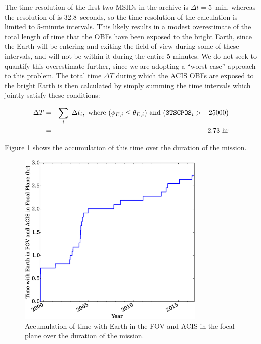 \documentclass[11pt]{article}
\begin{document}
The time resolution of the first two MSIDs in the archive is $\Delta{t} = 5$~min, whereas the resolution
of  is 32.8~seconds, so the time resolution of the calculation is limited to 5-minute intervals.
This likely results in a modest overestimate of the total length of time that the OBFs have been exposed to
the bright Earth, since the Earth will be entering and exiting the field of view during some of these intervals,
and will not be within it during the entire 5 minutes. We do not seek to quantify this overestimate further, since we are adopting a ``worst-case'' approach to this problem. The total time $\Delta{T}$ during which the ACIS OBFs are exposed to the bright Earth is then calculated by simply summing the time intervals which jointly satisfy these conditions:

\begin{eqnarray}
\Delta{T} &=& \displaystyle\sum_i~\Delta{t_i},~{\rm where}~(\phi_{E,i} \leq \theta_{E,i})~{\rm and}~(\texttt{3TSCPOS}_i > -25000) \\
\nonumber &=& 2.73~{\rm hr}
\end{eqnarray}

\noindent
Figure \ref{fig:time_accum} shows the accumulation of this time over the duration of the mission.

\begin{figure}
\begin{center}
\includegraphics[width=0.8\textwidth]{time_accum.eps}
\caption{Accumulation of time with Earth in the FOV and ACIS in the focal plane over the duration of the mission.\label{fig:time_accum}}
\end{center}
\end{figure}
\end{document}
